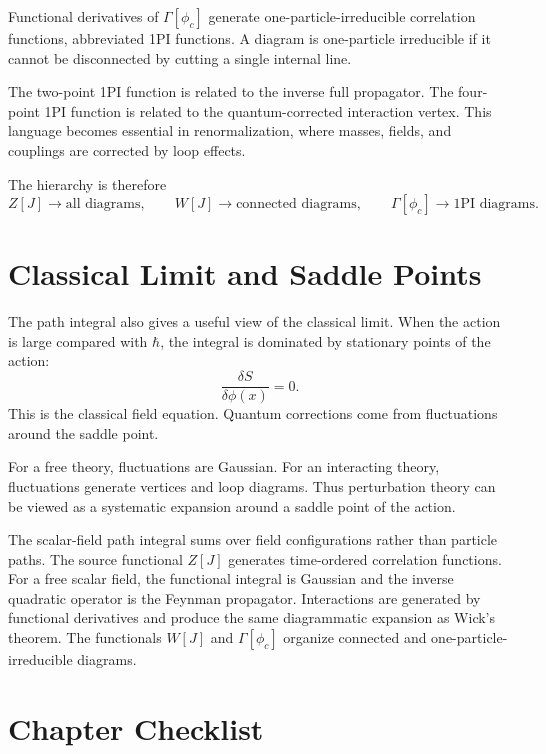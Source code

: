 Functional derivatives of \(\Gamma[\phi_c]\) generate one-particle-irreducible
correlation functions, abbreviated 1PI functions. A diagram is one-particle
irreducible if it cannot be disconnected by cutting a single internal line.

The two-point 1PI function is related to the inverse full propagator. The
four-point 1PI function is related to the quantum-corrected interaction vertex.
This language becomes essential in renormalization, where masses, fields, and
couplings are corrected by loop effects.

The hierarchy is therefore
\[
    Z[J] \longrightarrow \text{all diagrams},
    \qquad
    W[J] \longrightarrow \text{connected diagrams},
    \qquad
    \Gamma[\phi_c] \longrightarrow \text{1PI diagrams}.
\]

\section{Classical Limit and Saddle Points}

The path integral also gives a useful view of the classical limit. When the
action is large compared with \(\hbar\), the integral is dominated by stationary
points of the action:
\[
    \frac{\delta S}{\delta\phi(x)}=0.
\]
This is the classical field equation. Quantum corrections come from fluctuations
around the saddle point.

For a free theory, fluctuations are Gaussian. For an interacting theory,
fluctuations generate vertices and loop diagrams. Thus perturbation theory can
be viewed as a systematic expansion around a saddle point of the action.

\begin{summarybox}
The scalar-field path integral sums over field configurations rather than
particle paths. The source functional \(Z[J]\) generates time-ordered correlation
functions. For a free scalar field, the functional integral is Gaussian and the
inverse quadratic operator is the Feynman propagator. Interactions are generated
by functional derivatives and produce the same diagrammatic expansion as Wick's
theorem. The functionals \(W[J]\) and \(\Gamma[\phi_c]\) organize connected and
one-particle-irreducible diagrams.
\end{summarybox}

\section{Chapter Checklist}

